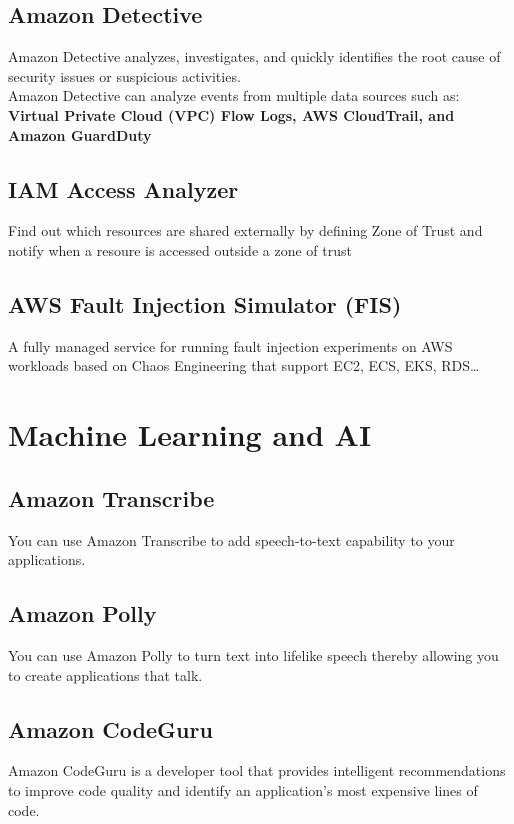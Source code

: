 \documentclass[12pt, letterpaper, twoside]{article}
\begin{document}
\subsection{Amazon Detective}
Amazon Detective analyzes, investigates, and quickly identifies the root cause of security issues or 
suspicious activities.\\
Amazon Detective can analyze events from multiple data sources such as:
\textbf{Virtual Private Cloud (VPC) Flow Logs, AWS CloudTrail, and Amazon GuardDuty}


\subsection{IAM Access Analyzer}
Find out which resources are shared externally by defining Zone of Trust and notify when a resoure is accessed
outside a zone of trust


\subsection{AWS Fault Injection Simulator (FIS)}
A fully managed service for running fault injection experiments on AWS workloads based on Chaos Engineering that support
EC2, ECS, EKS, RDS…

\section{Machine Learning and AI}
\subsection{Amazon Transcribe}
You can use Amazon Transcribe to add speech-to-text capability to your applications.

\subsection{Amazon Polly}
You can use Amazon Polly to turn text into lifelike speech thereby allowing you to create applications that talk.

\subsection{Amazon CodeGuru}
Amazon CodeGuru is a developer tool that provides intelligent recommendations to improve code quality and identify 
an application’s most expensive lines of code.\\
\end{document}
